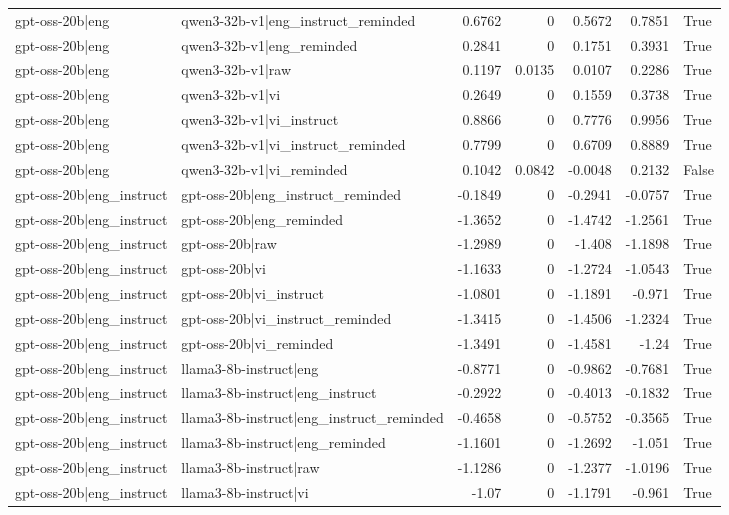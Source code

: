 \begin{table}
\begin{tabular}{l l r r r r l}
gpt-oss-20b|eng & qwen3-32b-v1|eng_instruct_reminded & 0.6762 & 0 & 0.5672 & 0.7851 & True \\
gpt-oss-20b|eng & qwen3-32b-v1|eng_reminded & 0.2841 & 0 & 0.1751 & 0.3931 & True \\
gpt-oss-20b|eng & qwen3-32b-v1|raw & 0.1197 & 0.0135 & 0.0107 & 0.2286 & True \\
gpt-oss-20b|eng & qwen3-32b-v1|vi & 0.2649 & 0 & 0.1559 & 0.3738 & True \\
gpt-oss-20b|eng & qwen3-32b-v1|vi_instruct & 0.8866 & 0 & 0.7776 & 0.9956 & True \\
gpt-oss-20b|eng & qwen3-32b-v1|vi_instruct_reminded & 0.7799 & 0 & 0.6709 & 0.8889 & True \\
gpt-oss-20b|eng & qwen3-32b-v1|vi_reminded & 0.1042 & 0.0842 & -0.0048 & 0.2132 & False \\
gpt-oss-20b|eng_instruct & gpt-oss-20b|eng_instruct_reminded & -0.1849 & 0 & -0.2941 & -0.0757 & True \\
gpt-oss-20b|eng_instruct & gpt-oss-20b|eng_reminded & -1.3652 & 0 & -1.4742 & -1.2561 & True \\
gpt-oss-20b|eng_instruct & gpt-oss-20b|raw & -1.2989 & 0 & -1.408 & -1.1898 & True \\
gpt-oss-20b|eng_instruct & gpt-oss-20b|vi & -1.1633 & 0 & -1.2724 & -1.0543 & True \\
gpt-oss-20b|eng_instruct & gpt-oss-20b|vi_instruct & -1.0801 & 0 & -1.1891 & -0.971 & True \\
gpt-oss-20b|eng_instruct & gpt-oss-20b|vi_instruct_reminded & -1.3415 & 0 & -1.4506 & -1.2324 & True \\
gpt-oss-20b|eng_instruct & gpt-oss-20b|vi_reminded & -1.3491 & 0 & -1.4581 & -1.24 & True \\
gpt-oss-20b|eng_instruct & llama3-8b-instruct|eng & -0.8771 & 0 & -0.9862 & -0.7681 & True \\
gpt-oss-20b|eng_instruct & llama3-8b-instruct|eng_instruct & -0.2922 & 0 & -0.4013 & -0.1832 & True \\
gpt-oss-20b|eng_instruct & llama3-8b-instruct|eng_instruct_reminded & -0.4658 & 0 & -0.5752 & -0.3565 & True \\
gpt-oss-20b|eng_instruct & llama3-8b-instruct|eng_reminded & -1.1601 & 0 & -1.2692 & -1.051 & True \\
gpt-oss-20b|eng_instruct & llama3-8b-instruct|raw & -1.1286 & 0 & -1.2377 & -1.0196 & True \\
gpt-oss-20b|eng_instruct & llama3-8b-instruct|vi & -1.07 & 0 & -1.1791 & -0.961 & True \\

\end{tabular}
\end{table}
